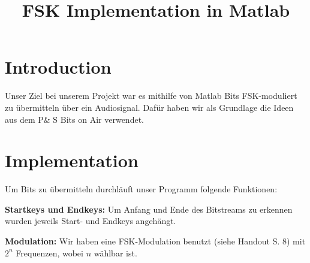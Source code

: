 \documentclass[11pt]{article}
\title{FSK Implementation in Matlab}
\begin{document}
\section*{Introduction}
Unser Ziel bei unserem Projekt war es mithilfe von Matlab Bits FSK-moduliert zu übermitteln über ein Audiosignal. Dafür haben wir als Grundlage die Ideen aus dem P\& S Bits on Air verwendet.
\section*{Implementation}
Um Bits zu übermitteln durchläuft unser Programm folgende Funktionen:

\textbf{Startkeys und Endkeys:} Um Anfang und Ende des Bitstreams zu erkennen wurden jeweils Start- und Endkeys angeh\"angt.

\textbf{Modulation:} Wir haben eine FSK-Modulation benutzt (siehe Handout S. 8) mit $2^n$ Frequenzen, wobei $n$ wählbar ist. 
\end{document}
